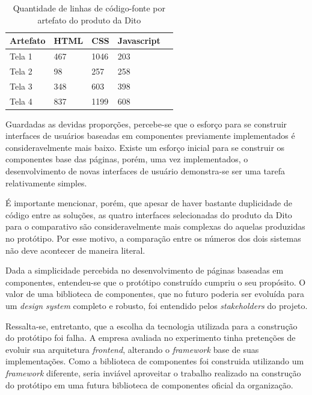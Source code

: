 \begin{table}
\centering
\begin{tabular}{|m{3cm}|m{1cm}|m{1cm}|m{1cm}|m{1cm}|} \hline
	
	\multicolumn{1}{|c|}{\bfseries Artefato} & \multicolumn{1}{c|}{\bfseries HTML} & \multicolumn{1}{c|}{\bfseries CSS} & \multicolumn{1}{c|}{\bfseries Javascript} \\\hline
	 Tela 1 & 467 & 1046 & 203 \\\hline
	 Tela 2 & 98 & 257 & 258 \\\hline
	 Tela 3 & 348 & 603 & 398  \\\hline
	 Tela 4 & 837 & 1199 & 608 \\\hline
    
\end{tabular}
\caption{Quantidade de linhas de código-fonte por artefato do produto da Dito}
\label{table:lineCountDito}
\end{table}

Guardadas as devidas proporções, percebe-se que o esforço para se construir interfaces de usuários baseadas em componentes previamente implementados é consideravelmente mais baixo. Existe um esforço inicial para se construir os componentes base das páginas, porém, uma vez implementados, o desenvolvimento de novas interfaces de usuário demonstra-se ser uma tarefa relativamente simples.

É importante mencionar, porém, que apesar de haver bastante duplicidade de código entre as soluções, as quatro interfaces selecionadas do produto da Dito para o comparativo são consideravelmente mais complexas do aquelas produzidas no protótipo. Por esse motivo, a comparação entre os números dos dois sistemas não deve acontecer de maneira literal.

Dada a simplicidade percebida no desenvolvimento de páginas baseadas em componentes, entendeu-se que o protótipo construído cumpriu o seu propósito. O valor de uma biblioteca de componentes, que no futuro poderia ser evoluída para um \textit{design system} completo e robusto, foi entendido pelos \textit{stakeholders} do projeto.

Ressalta-se, entretanto, que a escolha da tecnologia utilizada para a construção do protótipo foi falha. A empresa avaliada no experimento tinha pretenções de evoluir sua arquitetura \textit{frontend}, alterando o \textit{framework} base de suas implementações. Como a biblioteca de componentes foi construida utilizando um \textit{framework} diferente, seria inviável aproveitar o trabalho realizado na construção do protótipo em uma futura biblioteca de componentes oficial da organização.

